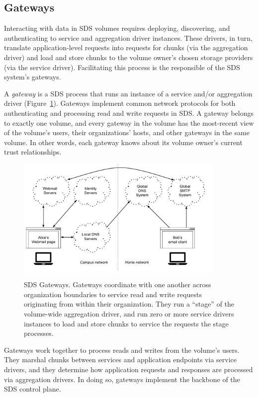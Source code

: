 \subsection{Gateways}

Interacting with data in SDS volumes requires deploying, discovering,
and authenticating to service and aggregation driver instances.  These drivers,
in turn, translate application-level requests into requests for chunks (via the
aggregation driver) and load and store chunks to the volume owner's chosen
storage providers (via the service driver).  Facilitating this process
is the responsible of the SDS system's gateways.

A \emph{gateway} is a SDS process that runs an instance of a service and/or
aggregation driver (Figure~\ref{fig:chap2-gateways}).
Gateways implement common network protocols for both
authenticating and processing read and write requests in SDS.  A gateway belongs
to exactly one volume, and every gateway in the volume has the most-recent
view of the volume's users, their organizations' hosts, and other gateways in
the same volume.  In other words, each gateway knows about its volume owner's current trust
relationships.

\begin{figure}[h]
   \caption{SDS Gateways.  Gateways coordinate with one another across
   organization boundaries to service read and write requests originating from
   within their organization.  They run a ``stage'' of the volume-wide aggregation driver,
   and run zero or more service drivers instances to load and store chunks to
   service the requests the stage processes.}
   \centering
   \includegraphics[width=0.9\textwidth,page=6]{figures/dissertation-figures}
   \label{fig:chap2-gateways}
\end{figure}

Gateways work together to process reads and writes from the volume's users.
They marshal chunks between services and application endpoints via service
drivers, and they determine how application requests and responses are processed
via aggregation drivers.  In doing so, gateways implement the backbone of
the SDS control plane.

